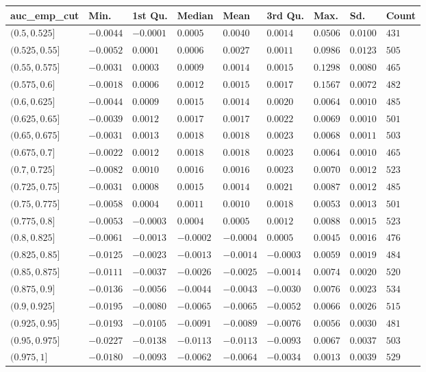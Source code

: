 
\begin{tabular}{l|l|l|l|l|l|l|l|l}
\hline
auc_emp_cut & Min. & 1st Qu. & Median & Mean & 3rd Qu. & Max. & Sd. & Count\\
\hline
$(0.5,0.525]$ & $-0.0044$ & $-0.0001$ & $0.0005$ & $0.0040$ & $0.0014$ & $0.0506$ & $0.0100$ & $431$\\
\hline
$(0.525,0.55]$ & $-0.0052$ & $0.0001$ & $0.0006$ & $0.0027$ & $0.0011$ & $0.0986$ & $0.0123$ & $505$\\
\hline
$(0.55,0.575]$ & $-0.0031$ & $0.0003$ & $0.0009$ & $0.0014$ & $0.0015$ & $0.1298$ & $0.0080$ & $465$\\
\hline
$(0.575,0.6]$ & $-0.0018$ & $0.0006$ & $0.0012$ & $0.0015$ & $0.0017$ & $0.1567$ & $0.0072$ & $482$\\
\hline
$(0.6,0.625]$ & $-0.0044$ & $0.0009$ & $0.0015$ & $0.0014$ & $0.0020$ & $0.0064$ & $0.0010$ & $485$\\
\hline
$(0.625,0.65]$ & $-0.0039$ & $0.0012$ & $0.0017$ & $0.0017$ & $0.0022$ & $0.0069$ & $0.0010$ & $501$\\
\hline
$(0.65,0.675]$ & $-0.0031$ & $0.0013$ & $0.0018$ & $0.0018$ & $0.0023$ & $0.0068$ & $0.0011$ & $503$\\
\hline
$(0.675,0.7]$ & $-0.0022$ & $0.0012$ & $0.0018$ & $0.0018$ & $0.0023$ & $0.0064$ & $0.0010$ & $465$\\
\hline
$(0.7,0.725]$ & $-0.0082$ & $0.0010$ & $0.0016$ & $0.0016$ & $0.0023$ & $0.0070$ & $0.0012$ & $523$\\
\hline
$(0.725,0.75]$ & $-0.0031$ & $0.0008$ & $0.0015$ & $0.0014$ & $0.0021$ & $0.0087$ & $0.0012$ & $485$\\
\hline
$(0.75,0.775]$ & $-0.0058$ & $0.0004$ & $0.0011$ & $0.0010$ & $0.0018$ & $0.0053$ & $0.0013$ & $501$\\
\hline
$(0.775,0.8]$ & $-0.0053$ & $-0.0003$ & $0.0004$ & $0.0005$ & $0.0012$ & $0.0088$ & $0.0015$ & $523$\\
\hline
$(0.8,0.825]$ & $-0.0061$ & $-0.0013$ & $-0.0002$ & $-0.0004$ & $0.0005$ & $0.0045$ & $0.0016$ & $476$\\
\hline
$(0.825,0.85]$ & $-0.0125$ & $-0.0023$ & $-0.0013$ & $-0.0014$ & $-0.0003$ & $0.0059$ & $0.0019$ & $484$\\
\hline
$(0.85,0.875]$ & $-0.0111$ & $-0.0037$ & $-0.0026$ & $-0.0025$ & $-0.0014$ & $0.0074$ & $0.0020$ & $520$\\
\hline
$(0.875,0.9]$ & $-0.0136$ & $-0.0056$ & $-0.0044$ & $-0.0043$ & $-0.0030$ & $0.0076$ & $0.0023$ & $534$\\
\hline
$(0.9,0.925]$ & $-0.0195$ & $-0.0080$ & $\mathbf{-0.0065}$ & $\mathbf{-0.0065}$ & $-0.0052$ & $0.0066$ & $0.0026$ & $515$\\
\hline
$(0.925,0.95]$ & $-0.0193$ & $-0.0105$ & $\mathbf{-0.0091}$ & $\mathbf{-0.0089}$ & $-0.0076$ & $0.0056$ & $0.0030$ & $481$\\
\hline
$(0.95,0.975]$ & $-0.0227$ & $-0.0138$ & $\mathbf{-0.0113}$ & $\mathbf{-0.0113}$ & $-0.0093$ & $0.0067$ & $0.0037$ & $503$\\
\hline
$(0.975,1]$ & $-0.0180$ & $-0.0093$ & $\mathbf{-0.0062}$ & $\mathbf{-0.0064}$ & $-0.0034$ & $0.0013$ & $0.0039$ & $529$\\
\hline
\end{tabular}
